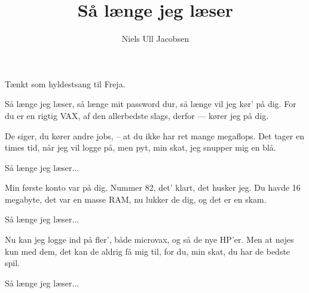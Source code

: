 \documentclass[a4paper,11pt]{article}
\title{Så længe jeg læser}
\author{Niels Ull Jacobsen}
\begin{document}
\maketitle

Tænkt som hyldestsang til Freja. \bigskip

\noindent
\begin{song}
Så længe jeg læser,
så længe mit password dur,
så længe vil jeg kør' på dig.
For du er en rigtig VAX,
af den allerbedste slags,
derfor --- kører jeg på dig.

\bigskip

De siger, du kører andre jobs,
-- at du ikke har ret mange megaflops.
Det tager en times tid, når jeg vil logge på,
men pyt, min skat, jeg snupper mig en blå.

\bigskip

Så længe jeg læser...

\bigskip

Min første konto var på dig.
Nummer 82, det' klart, det husker jeg.
Du havde 16 megabyte, det var en masse RAM,
nu lukker de dig, og det er en skam.

\bigskip

Så længe jeg læser...

\bigskip

Nu kan jeg logge ind på fler',
både microvax, og så de nye HP'er.
Men at nøjes kun med dem, det kan de aldrig få mig til,
for du, min skat, du har de bedste spil.

\bigskip

Så længe jeg læser...

\end{song}
\end{document}
